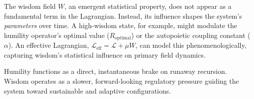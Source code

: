 The wisdom field \(W\), an emergent statistical property, does not appear as a fundamental term in the Lagrangian. Instead, its influence shapes the system's \textit{parameters} over time. A high-wisdom state, for example, might modulate the humility operator's optimal value (\(R_{\text{optimal}}\)) or the autopoietic coupling constant (\(\alpha\)). An effective Lagrangian, \(\mathcal{L}_{\text{eff}} = \mathcal{L} + \mu W\), can model this phenomenologically, capturing wisdom's statistical influence on primary field dynamics.

Humility functions as a direct, instantaneous brake on runaway recursion. Wisdom operates as a slower, forward-looking regulatory pressure guiding the system toward sustainable and adaptive configurations.